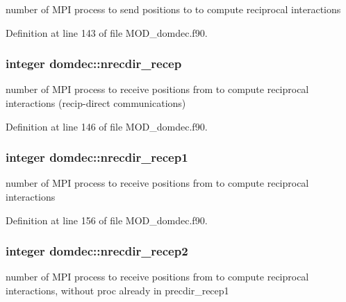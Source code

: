 number of M\-P\-I process to send positions to to compute reciprocal interactions 



Definition at line 143 of file M\-O\-D\-\_\-domdec.\-f90.

\hypertarget{classdomdec_a5aeb41a854f8678a4751145d51b6c3ab}{
\subsubsection[{nrecdir\-\_\-recep}]{\setlength{\rightskip}{0pt plus 5cm}integer domdec\-::nrecdir\-\_\-recep}}\label{classdomdec_a5aeb41a854f8678a4751145d51b6c3ab}


number of M\-P\-I process to receive positions from to compute reciprocal interactions (recip-\/direct communications) 



Definition at line 146 of file M\-O\-D\-\_\-domdec.\-f90.

\hypertarget{classdomdec_a542f5d5bbc9198e5190417cf45390b81}{
\subsubsection[{nrecdir\-\_\-recep1}]{\setlength{\rightskip}{0pt plus 5cm}integer domdec\-::nrecdir\-\_\-recep1}}\label{classdomdec_a542f5d5bbc9198e5190417cf45390b81}


number of M\-P\-I process to receive positions from to compute reciprocal interactions 



Definition at line 156 of file M\-O\-D\-\_\-domdec.\-f90.

\hypertarget{classdomdec_aa19f1045696509fac6e8b872424a332f}{
\subsubsection[{nrecdir\-\_\-recep2}]{\setlength{\rightskip}{0pt plus 5cm}integer domdec\-::nrecdir\-\_\-recep2}}\label{classdomdec_aa19f1045696509fac6e8b872424a332f}


number of M\-P\-I process to receive positions from to compute reciprocal interactions, without proc already in precdir\-\_\-recep1 



